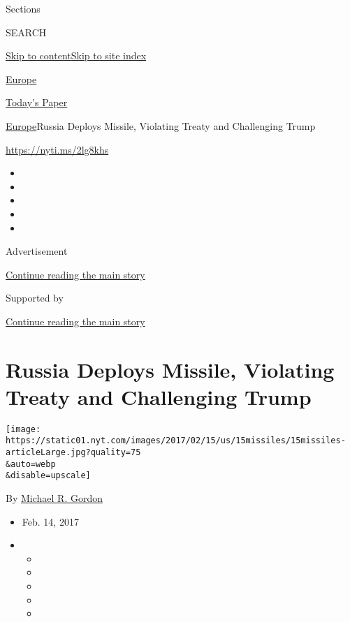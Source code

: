 Sections

SEARCH

\protect\hyperlink{site-content}{Skip to
content}\protect\hyperlink{site-index}{Skip to site index}

\href{https://www.nytimes.com/section/world/europe}{Europe}

\href{https://myaccount.nytimes.com/auth/login?response_type=cookie\&client_id=vi}{}

\href{https://www.nytimes.com/section/todayspaper}{Today's Paper}

\href{/section/world/europe}{Europe}\textbar{}Russia Deploys Missile,
Violating Treaty and Challenging Trump

\url{https://nyti.ms/2lg8khs}

\begin{itemize}
\item
\item
\item
\item
\item
\end{itemize}

Advertisement

\protect\hyperlink{after-top}{Continue reading the main story}

Supported by

\protect\hyperlink{after-sponsor}{Continue reading the main story}

\hypertarget{russia-deploys-missile-violating-treaty-and-challenging-trump}{%
\section{Russia Deploys Missile, Violating Treaty and Challenging
Trump}\label{russia-deploys-missile-violating-treaty-and-challenging-trump}}

\texttt{[image: https://static01.nyt.com/images/2017/02/15/us/15missiles/15missiles-articleLarge.jpg?quality=75\\\&auto=webp\\\&disable=upscale]}

By \href{http://www.nytimes.com/by/michael-r-gordon}{Michael R. Gordon}

\begin{itemize}
\item
  Feb. 14, 2017
\item
  \begin{itemize}
  \item
  \item
  \item
  \item
  \item
  \end{itemize}
\end{itemize}


